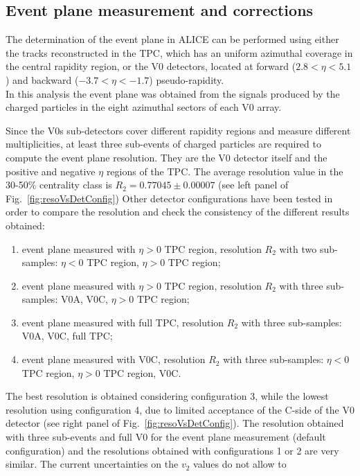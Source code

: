 \subsection{Event plane measurement and corrections}

The determination of the event plane in ALICE can be performed using
either the tracks reconstructed in the TPC, which has an uniform
azimuthal coverage in the central rapidity region, or the V0
detectors, located at forward ($2.8<\eta<5.1$) and backward
($-3.7<\eta<-1.7$) pseudo-rapidity.\\
In this analysis the event plane was obtained from the 
signals produced by the charged particles in the eight 
azimuthal sectors of each V0 array.


Since the V0s sub-detectors cover different rapidity 
regions and measure different multiplicities, at least 
three sub-events of charged particles are required to 
compute the event plane resolution.
They are the V0 detector itself and the 
positive and negative $\eta$ regions of the TPC.
The average resolution value in the 30-50\% centrality class is
$R_2 = 0.77045 \pm 0.00007$ (see left panel 
of Fig.~\ref{fig:resoVsDetConfig}) 
Other detector 
configurations have been tested in order to compare 
the resolution and check the consistency of the different 
results obtained:
\begin{enumerate}
\item event plane measured with $\eta > 0$ TPC region,  
resolution $R_2$ with two sub-samples: $\eta < 0$ TPC region, 
$\eta > 0$ TPC region;
\item event plane measured with $\eta > 0$ TPC region,  
resolution $R_2$ with three sub-samples: V0A, V0C, $\eta > 0$ TPC region; 
\item event plane measured with full TPC,  
resolution $R_2$ with three sub-samples: V0A, V0C, full TPC; 
\item event plane measured with V0C,  
resolution $R_2$ with three sub-samples:  $\eta < 0$ TPC region, $\eta > 0$ TPC region, V0C.
\end{enumerate}
The best resolution is obtained considering configuration 3, 
while the lowest resolution using configuration 4, due to
limited acceptance of the C-side of the V0 detector (see right panel 
of Fig.~\ref{fig:resoVsDetConfig}). 
The resolution obtained with three sub-events and full V0 for the event
plane measurement (default configuration) and the 
resolutions obtained with configurations 1 or 2 are very similar. 
The current uncertainties on the $v_2$ values do not allow to
